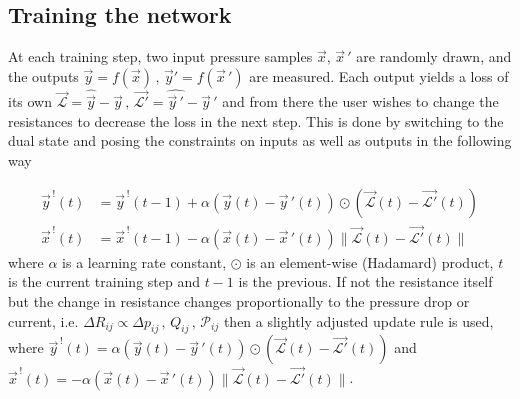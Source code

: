 \documentclass[%
 reprint,
 amsmath,amssymb,
 aps,
]{revtex4-2}
\begin{document}
\subsection{Training the network}\label{sec:training}

    At each training step, two input pressure samples $\vec{x},\,\vec{x}\,'$ are randomly drawn, and the outputs $\vec{y}=f\left(\vec{x}\right)\,,\,\vec{y}'=f\left(\vec{x}\,'\right)$ are measured. Each output yields a loss of its own $\vec{\mathcal{L}}=\widehat{\vec{y}}-\vec{y}\,,\,\vec{\mathcal{L}'}=\widehat{\vec{y}\,'}-\vec{y}\,'$ and from there the user wishes to change the resistances to decrease the loss in the next step. This is done by switching to the dual state and posing the constraints on inputs as well as outputs in the following way


    \begin{align}
    \vec{y}^{\,!}\left(t\right) &= \vec{y}^{\,!}\left(t-1\right)
    +  \alpha\left(\vec{y}\left(t\right)-\vec{y}\,'\left(t\right)\right) 
    \odot \left(\vec{\mathcal{L}}\left(t\right)-\vec{\mathcal{L}'}\left(t\right)\right) \label{eq:dual_values_x} \\
    \vec{x}^{\,!}\left(t\right) &=  \vec{x}^{\,!}\left(t-1\right)
    - \alpha\left(\vec{x}\left(t\right)-\vec{x}\,'\left(t\right)\right) 
    \|\vec{\mathcal{L}}\left(t\right)-\vec{\mathcal{L}'}\left(t\right)\| \label{eq:dual_values_p}
    \end{align}
    where $\alpha$ is a learning rate constant, $ \odot$ is an element-wise (Hadamard) product, $t$ is the current training step and $t-1$ is the previous. If not the resistance itself but the change in resistance changes proportionally to the pressure drop or current, i.e. 
    $\Delta R_{ij} \propto \Delta p_{ij} \, , \,Q_{ij}\, , \, \mathcal{P}_{ij}$ 
    then a slightly adjusted update rule is used, where
    $\vec{y}^{\,!}\left(t\right) = \alpha\left(\vec{y}\left(t\right)-\vec{y}\,'\left(t\right)\right)\odot\left(\vec{\mathcal{L}}\left(t\right)-\vec{\mathcal{L}'}\left(t\right)\right)$ 
    and 
    $\vec{x}^{\,!}\left(t\right) = -\alpha\left(\vec{x}\left(t\right)-\vec{x}\,'\left(t\right)\right)\|\vec{\mathcal{L}}\left(t\right)-\vec{\mathcal{L}'}\left(t\right)\|$.
    
\end{document}
